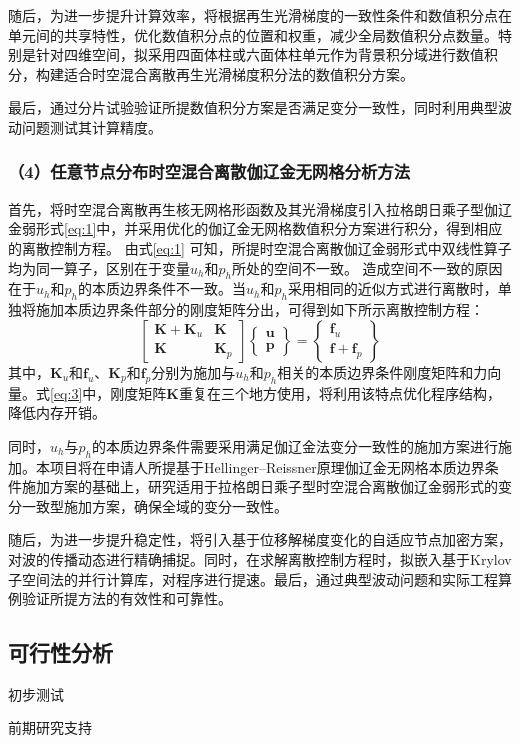 随后，为进一步提升计算效率，将根据再生光滑梯度的一致性条件和数值积分点在单元间的共享特性，优化数值积分点的位置和权重，减少全局数值积分点数量。特别是针对四维空间，拟采用四面体柱或六面体柱单元作为背景积分域进行数值积分，构建适合时空混合离散再生光滑梯度积分法的数值积分方案。

    

最后，通过分片试验验证所提数值积分方案是否满足变分一致性，同时利用典型波动问题测试其计算精度。

\subsubsection*{\bfseries （4）任意节点分布时空混合离散伽辽金无网格分析方法}
首先，将时空混合离散再生核无网格形函数及其光滑梯度引入拉格朗日乘子型伽辽金弱形式\eqref{eq:1}中，并采用优化的伽辽金无网格数值积分方案进行积分，得到相应的离散控制方程。
由式\eqref{eq:1} 可知，所提时空混合离散伽辽金弱形式中双线性算子均为同一算子，区别在于变量$u_h$和$p_h$所处的空间不一致。
造成空间不一致的原因在于$u_h$和$p_h$的本质边界条件不一致。当$u_h$和$p_h$采用相同的近似方式进行离散时，单独将施加本质边界条件部分的刚度矩阵分出，可得到如下所示离散控制方程：
\begin{equation}
    \begin{bmatrix} 
        \boldsymbol K + \boldsymbol K_{u} & \boldsymbol K \\
        \boldsymbol K & \boldsymbol K_{p} 
    \end{bmatrix} 
    \begin{Bmatrix}
        \boldsymbol u \\ \boldsymbol p
    \end{Bmatrix} =
    \begin{Bmatrix} \boldsymbol f_u \\ \boldsymbol f + \boldsymbol f_p \end{Bmatrix}
    \label{eq:3} 
\end{equation}
其中，$\boldsymbol K_u$和$\boldsymbol f_u$、$\boldsymbol K_p$和$\boldsymbol f_p$分别为施加与$u_h$和$p_h$相关的本质边界条件刚度矩阵和力向量。式\eqref{eq:3}中，刚度矩阵$\boldsymbol K$重复在三个地方使用，将利用该特点优化程序结构，降低内存开销。

同时，$u_h$与$p_h$的本质边界条件需要采用满足伽辽金法变分一致性的施加方案进行施加。本项目将在申请人所提基于Hellinger--Reissner原理伽辽金无网格本质边界条件施加方案的基础上，研究适用于拉格朗日乘子型时空混合离散伽辽金弱形式的变分一致型施加方案，确保全域的变分一致性。

随后，为进一步提升稳定性，将引入基于位移解梯度变化的自适应节点加密方案，对波的传播动态进行精确捕捉。同时，在求解离散控制方程时，拟嵌入基于Krylov子空间法的并行计算库，对程序进行提速。最后，通过典型波动问题和实际工程算例验证所提方法的有效性和可靠性。

\subsection{可行性分析}

初步测试

前期研究支持

